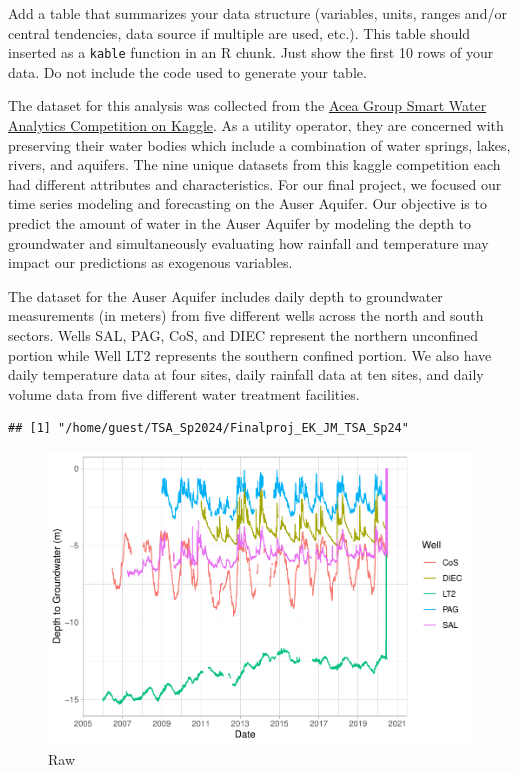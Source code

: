 \documentclass[
]{article}
\begin{document}
Add a table that summarizes your data structure (variables, units,
ranges and/or central tendencies, data source if multiple are used,
etc.). This table should inserted as a \texttt{kable} function in an R
chunk. Just show the first 10 rows of your data. Do not include the code
used to generate your table.

The dataset for this analysis was collected from the
\href{https://www.kaggle.com/c/acea-water-prediction/data}{Acea Group
Smart Water Analytics Competition on Kaggle}. As a utility operator,
they are concerned with preserving their water bodies which include a
combination of water springs, lakes, rivers, and aquifers. The nine
unique datasets from this kaggle competition each had different
attributes and characteristics. For our final project, we focused our
time series modeling and forecasting on the Auser Aquifer. Our objective
is to predict the amount of water in the Auser Aquifer by modeling the
depth to groundwater and simultaneously evaluating how rainfall and
temperature may impact our predictions as exogenous variables.

The dataset for the Auser Aquifer includes daily depth to groundwater
measurements (in meters) from five different wells across the north and
south sectors. Wells SAL, PAG, CoS, and DIEC represent the northern
unconfined portion while Well LT2 represents the southern confined
portion. We also have daily temperature data at four sites, daily
rainfall data at ten sites, and daily volume data from five different
water treatment facilities.

\begin{verbatim}
## [1] "/home/guest/TSA_Sp2024/Finalproj_EK_JM_TSA_Sp24"
\end{verbatim}

\begin{figure}
\centering
\includegraphics{Kaufman_McNeill_ENV797_Project_files/figure-latex/import data-1.pdf}
\caption{Raw}
\end{figure}
\end{document}
